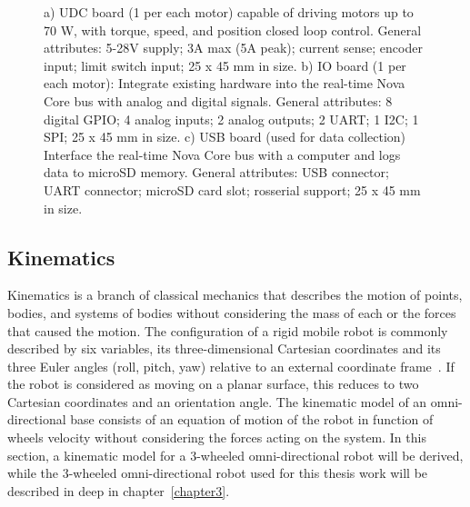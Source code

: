 \begin{figure}[H]
  \caption{a) UDC board (1 per each motor) capable of driving motors up to 70 W, with torque, speed, and position closed loop control. General attributes: 5-28V supply; 3A max (5A peak); current sense; encoder input; limit switch input; 25 x 45 mm in size. b) IO board (1 per each motor): Integrate existing hardware into the real-time Nova Core bus with analog and digital signals. General attributes: 8 digital GPIO;  4 analog inputs; 2 analog outputs; 2 UART; 1 I2C; 1 SPI; 25 x 45 mm in size. c) USB board (used for data collection) Interface the real-time Nova Core bus with a computer and logs data to microSD memory. General attributes: USB connector;  UART connector; microSD card slot; rosserial support; 25 x 45 mm in size.}
  \label{fig:boards}
\end{figure}

\subsection{Kinematics}\label{sec:kinematics}

Kinematics is a branch of classical mechanics that describes the motion of points, bodies, and systems of bodies without considering the mass of each or the forces that caused the motion.
The configuration of a rigid mobile robot is commonly described by six variables, its three-dimensional Cartesian coordinates and its three Euler angles (roll, pitch, yaw) relative to an external coordinate frame~\cite{thrun_probabilistic_2005}. If the robot is considered as moving on a planar surface, this reduces to two Cartesian coordinates and an orientation angle.
The kinematic model of an omni-directional base consists of an equation of motion of the robot in function of wheels velocity without considering the forces acting on the system. In this section, a kinematic model for a 3-wheeled omni-directional robot will be derived, while the 3-wheeled omni-directional robot used for this thesis work will be described in deep in chapter~\ref{chapter3}.

